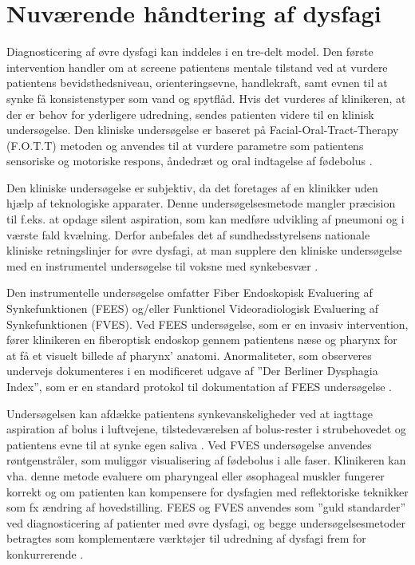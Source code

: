 \documentclass[main.tex]{subfiles}
\begin{document}
\section*{Nuværende håndtering af dysfagi}


Diagnosticering af øvre dysfagi kan inddeles i en tre-delt model. Den første intervention handler om at screene patientens mentale tilstand ved at vurdere patientens bevidsthedsniveau, orienteringsevne, handlekraft, samt evnen til at synke få konsistenstyper som vand og spytflåd. Hvis det vurderes af klinikeren, at der er behov for yderligere udredning, sendes patienten videre til en klinisk undersøgelse. Den kliniske undersøgelse er baseret på Facial-Oral-Tract-Therapy (F.O.T.T) metoden og anvendes til at vurdere parametre som patientens sensoriske og motoriske respons, åndedræt og oral indtagelse af fødebolus \cite[s. 23-25]{Kjaersgaard2013DifficultiesPerspective}. 

Den kliniske undersøgelse er subjektiv, da det foretages af en klinikker uden hjælp af teknologiske apparater. Denne undersøgelsesmetode mangler præcision til f.eks. at opdage silent aspiration, som kan medføre udvikling af pneumoni og i værste fald kvælning. Derfor anbefales det af sundhedsstyrelsens nationale kliniske retningslinjer for øvre dysfagi, at man supplere den kliniske undersøgelse med en instrumentel undersøgelse til voksne med synkebesvær \cite{Sundhedsstyrelsen2015NationalDysfagi}.

Den instrumentelle undersøgelse omfatter Fiber Endoskopisk Evaluering af Synkefunktionen (FEES) og/eller Funktionel Videoradiologisk Evaluering af Synkefunktionen (FVES).  Ved FEES undersøgelse, som er en invasiv intervention, fører klinikeren en fiberoptisk endoskop gennem patientens næse og pharynx for at få et visuelt billede af pharynx' anatomi. Anormaliteter, som observeres undervejs dokumenteres i en modificeret udgave af ”Der Berliner Dysphagia Index”, som er en standard protokol til dokumentation af FEES undersøgelse \cite{afLambertsenKMDKock-JensenCMDKjrsgaardAMScOTHansenTSMsci/MPHWestergaardLMD2007ModificeretIndex}. 

Undersøgelsen kan afdække patientens synkevanskeligheder ved at iagttage aspiration af bolus i luftvejene, tilstedeværelsen af bolus-rester i strubehovedet og patientens evne til at synke egen saliva \cite[s. 27-28]{Kjaersgaard2013DifficultiesPerspective}. 
Ved FVES undersøgelse anvendes røntgenstråler, som muliggør visualisering af fødebolus i alle faser. Klinikeren kan vha. denne metode evaluere om pharyngeal eller øsophageal muskler fungerer korrekt og om patienten kan kompensere for dysfagien med reflektoriske teknikker som fx ændring af hovedstilling. FEES og FVES anvendes som ”guld standarder” ved diagnosticering af patienter med øvre dysfagi, og begge undersøgelsesmetoder betragtes som komplementære værktøjer til udredning af dysfagi frem for konkurrerende \cite[s. 50]{Kjaersgaard2013DifficultiesPerspective}.




\end{document}
